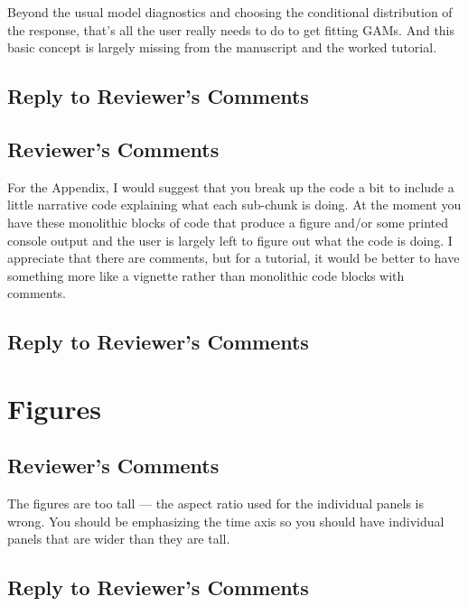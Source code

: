 \documentclass[
]{article}
\begin{document}
Beyond the usual model diagnostics and choosing the conditional distribution of the response, that's all the user really needs to do to get fitting GAMs. And this basic concept is largely missing from the manuscript and the worked tutorial.

\hypertarget{section-12}{%
\subsection{\texorpdfstring{\textcolor{reviewersblue} {Reply to Reviewer's Comments}}{}}\label{section-12}}

\hypertarget{reviewers-comments-12}{%
\subsection{Reviewer's Comments}\label{reviewers-comments-12}}

For the Appendix, I would suggest that you break up the code a bit to include a little narrative code explaining what each sub-chunk is doing. At the moment you have these monolithic blocks of code that produce a figure and/or some
printed console output and the user is largely left to figure out what the code is doing. I appreciate that there are comments, but for a tutorial, it would be better to have something more like a vignette rather than monolithic code
blocks with comments.

\hypertarget{section-13}{%
\subsection{\texorpdfstring{\textcolor{reviewersblue} {Reply to Reviewer's Comments}}{}}\label{section-13}}

\hypertarget{figures}{%
\section{Figures}\label{figures}}

\hypertarget{reviewers-comments-13}{%
\subsection{Reviewer's Comments}\label{reviewers-comments-13}}

The figures are too tall --- the aspect ratio used for the individual panels is wrong. You should be emphasizing the time axis so you should have individual panels that are wider than they are tall.

\hypertarget{section-14}{%
\subsection{\texorpdfstring{\textcolor{reviewersblue} {Reply to Reviewer's Comments}}{}}\label{section-14}}
\end{document}
